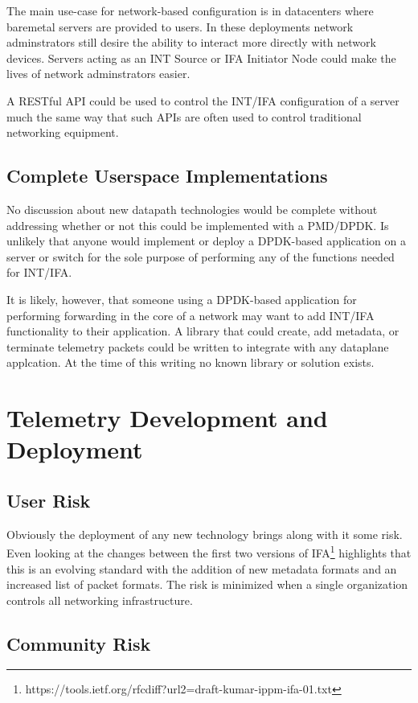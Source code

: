 \documentclass[letterpaper,twocolumn,10pt]{article}
\begin{document}
The main use-case for network-based configuration is in datacenters
where baremetal servers are provided to users.  In these deployments
network adminstrators still desire the ability to interact more directly
with network devices.  Servers acting as an INT Source or IFA Initiator
Node could make the lives of network adminstrators easier.

A RESTful API could be used to control the INT/IFA configuration
of a server much the same way that such APIs are often used to control
traditional networking equipment.

\subsection{Complete Userspace Implementations}

No discussion about new datapath technologies would be complete without
addressing whether or not this could be implemented with a PMD/DPDK.  Is
unlikely that anyone would implement or deploy a DPDK-based application
on a server or switch for the sole purpose of performing any of the
functions needed for INT/IFA.

It is likely, however, that someone using a DPDK-based application for
performing forwarding in the core of a network may want to add INT/IFA
functionality to their application.  A library that could create, add
metadata, or terminate telemetry packets could be written to integrate
with any dataplane applcation.  At the time of this writing no known
library or solution exists.

\section{Telemetry Development and Deployment}

\subsection{User Risk}

Obviously the deployment of any new technology brings along with it some
risk.  Even looking at the changes between the first two versions of
IFA\footnote{https://tools.ietf.org/rfcdiff?url2=draft-kumar-ippm-ifa-01.txt} 
highlights that this is an evolving standard with the addition of new
metadata formats and an increased list of packet formats.  The risk is
minimized when a single organization controls all networking
infrastructure.

\subsection{Community Risk}
\end{document}
